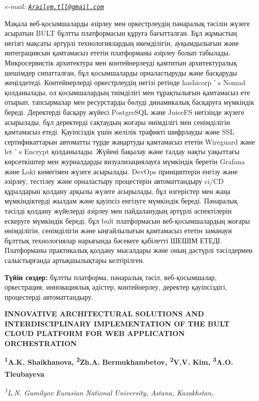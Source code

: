{\emph{e-mail:
\href{mailto:Arailym.tll@gmail.com}{\nolinkurl{Arailym.tll@gmail.com}}}

Мақала веб-қосымшаларды әзірлеу мен оркестрлеудің пәнаралық тәсілін
жүзеге асыратын BULT бұлтты платформасын құруға бағытталған. Бұл
жұмыстың негізгі мақсаты әртүрлі технологиялардың икемділігін,
ауқымдылығын және интеграциясын қамтамасыз ететін платформаны әзірлеу
болып табылады. Микросервистік архитектура мен контейнерлеуді қамтитын
архитектуралық шешімдер сипатталған, бұл қосымшаларды орналастыруды және
басқаруды жеңілдетеді. Контейнерлерді оркестрлеудің негізі ретінде
hashicorp '{} s Nomad қолданылады, ол қосымшалардың
тиімділігі мен тұрақтылығын қамтамасыз ете отырып, тапсырмалар мен
ресурстарды бөлуді динамикалық басқаруға мүмкіндік береді. Деректерді
басқару жүйесі PostgreSQL және JuiceFS негізінде жүзеге асырылады, бұл
деректерді сақтаудың жоғары өнімділігі мен сенімділігін қамтамасыз
етеді. Қауіпсіздік үшін желілік трафикті шифрлауды және SSL
сертификаттарын автоматты түрде жаңартуды қамтамасыз ететін Wireguard
және let '{} s Encrypt қолданылады. Жүйені бақылау және
талдау нақты уақыттағы көрсеткіштер мен журналдарды визуализациялауға
мүмкіндік беретін Grafana және Loki көмегімен жүзеге асырылады. DevOps
принциптерін енгізу және әзірлеу, тестілеу және орналастыру процестерін
автоматтандыру ci/CD құралдарын қолдану арқылы жүзеге асырылады, бұл
өзгерістер мен жаңа мүмкіндіктерді жылдам және қауіпсіз енгізуге
мүмкіндік береді. Пәнаралық тәсілді қолдану жүйелерді әзірлеу мен
пайдаланудың әртүрлі аспектілерін ескеруге мүмкіндік береді, бұл bult
платформасын веб-қосымшалардың жоғары өнімділігін, сенімділігін және
ыңғайлылығын қамтамасыз ететін заманауи бұлттық технологиялар нарығында
бәсекеге қабілетті ШЕШІМ ЕТЕДІ. Платформаны практикалық қолдану
мысалдары және оның дәстүрлі тәсілдермен салыстырғанда артықшылықтары
келтірілген.

{\bfseries Түйін сөздер:} бұлтты платформа, пәнаралық тәсіл,
веб-қосымшалар, оркестрация, инновациялық әдістер, контейнерлеу,
деректер қауіпсіздігі, процестерді автоматтандыру.

{\bfseries INNOVATIVE ARCHITECTURAL SOLUTIONS AND INTERDISCIPLINARY
IMPLEMENTATION OF THE BULT CLOUD PLATFORM FOR WEB APPLICATION
ORCHESTRATION}

{\bfseries \textsuperscript{1}A.K. Shaikhanova, \textsuperscript{2}Zh.A.}
{\bfseries Bermukhambetov, \textsuperscript{2}V.V. Kim,
\textsuperscript{3}A.O. Tleubayeva\textsuperscript{\envelope }}

\emph{\textsuperscript{1}L.N. Gumilyov Eurasian National University,
Astana, Kazakhstan,}

}
